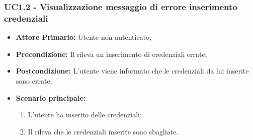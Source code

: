 \subsubsection{UC1.2 - Visualizzazione messaggio di errore inserimento credenziali}
\label{UC1.2}
\begin{itemize}
\item \textbf{Attore Primario:} Utente non autenticato;
\item \textbf{Precondizione:} Il  rileva un inserimento di credenziali errate;
\item \textbf{Postcondizione:} L'utente viene informato che le credenziali da lui inserite sono errate;
\item \textbf{Scenario principale:}
    \begin{enumerate}
    \item L'utente ha inserito delle credenziali;
    \item Il  rileva che le credenziali inserite sono sbagliate.
    \end{enumerate}
\end{itemize}